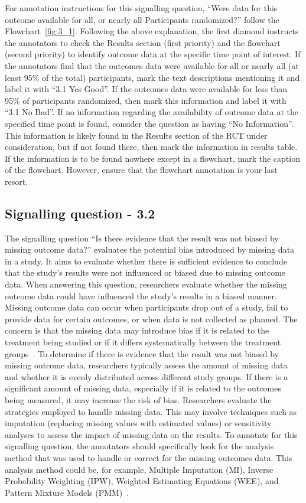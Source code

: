 \documentclass[sn-mathphys,Numbered]{sn-jnl}%
\begin{document}
For annotation instructions for this signalling question, ``Were data for this outcome available for all, or nearly all Participants randomized?'' follow the Flowchart~\ref{fig:3_1}.
Following the above explanation, the first diamond instructs the annotators to check the Results section (first priority) and the flowchart (second priority) to identify outcome data at the specific time point of interest.
If the annotators find that the outcomes data were available for all or nearly all (at least 95\% of the total) participants, mark the text descriptions mentioning it and label it with ``3.1 Yes Good''.
If the outcomes data were available for less than 95\% of participants randomized, then mark this information and label it with ``3.1 No Bad''.
If no information regarding the availability of outcome data at the specified time point is found, consider the question as having ``No Information''.
This information is likely found in the Results section of the RCT under consideration, but if not found there, then mark the information in results table. 
If the information is to be found nowhere except in a flowchart, mark the caption of the flowchart.
However, ensure that the flowchart annotation is your last resort.
%
%
%
\subsection*{Signalling question - 3.2 }
%
The signalling question ``Is there evidence that the result was not biased by missing outcome data?'' evaluates the potential bias introduced by missing data in a study.
It aims to evaluate whether there is sufficient evidence to conclude that the study's results were not influenced or biased due to missing outcome data.
When answering this question, researchers evaluate whether the missing outcome data could have influenced the study's results in a biased manner.
Missing outcome data can occur when participants drop out of a study, fail to provide data for certain outcomes, or when data is not collected as planned.
The concern is that the missing data may introduce bias if it is related to the treatment being studied or if it differs systematically between the treatment groups~\cite{akl2012potential}.
To determine if there is evidence that the result was not biased by missing outcome data, researchers typically assess the amount of missing data and whether it is evenly distributed across different study groups.
If there is a significant amount of missing data, especially if it is related to the outcomes being measured, it may increase the risk of bias.
Researchers evaluate the strategies employed to handle missing data.
This may involve techniques such as imputation (replacing missing values with estimated values) or sensitivity analyses to assess the impact of missing data on the results.
To annotate for this signalling question, the annotators should specifically look for the analysis method that was used to handle or correct for the missing outcomes data.
This analysis method could be, for example, Multiple Imputation (MI), Inverse Probability Weighting (IPW), Weighted Estimating Equations (WEE), and Pattern Mixture Models (PMM)~\cite{bell2014handling,khan2021missing}.
\end{document}
